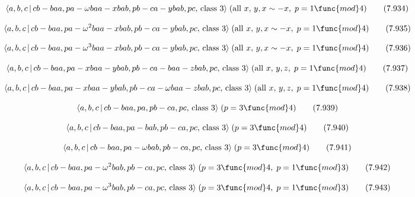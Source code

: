 \documentclass[10pt]{article}
\begin{document}
\begin{equation}
\langle a,b,c\,|\,cb-baa,pa-\omega baa-xbab,pb-ca-ybab,pc,\,\text{class }%
3\rangle \;(\text{all }x,\,y,x\sim -x,\;p=1\func{mod}4)  \tag{7.934}
\end{equation}

\begin{equation}
\langle a,b,c\,|\,cb-baa,pa-\omega ^{2}baa-xbab,pb-ca-ybab,pc,\,\text{class }%
3\rangle \;(\text{all }x,\,y,x\sim -x,\;p=1\func{mod}4)  \tag{7.935}
\end{equation}

\begin{equation}
\langle a,b,c\,|\,cb-baa,pa-\omega ^{3}baa-xbab,pb-ca-ybab,pc,\,\text{class }%
3\rangle \;(\text{all }x,\,y,x\sim -x,\;p=1\func{mod}4)  \tag{7.936}
\end{equation}

\begin{equation}
\langle a,b,c\,|\,cb-baa,pa-xbaa-ybab,pb-ca-baa-zbab,pc,\,\text{class }%
3\rangle \;(\text{all }x,\,y,z,\;p=1\func{mod}4)  \tag{7.937}
\end{equation}

\begin{equation}
\langle a,b,c\,|\,cb-baa,pa-xbaa-ybab,pb-ca-\omega baa-zbab,pc,\,\text{class 
}3\rangle \;(\text{all }x,\,y,z,\;p=1\func{mod}4)  \tag{7.938}
\end{equation}

\begin{equation}
\langle a,b,c\,|\,cb-baa,pa,pb-ca,pc,\,\text{class }3\rangle \;(p=3 \func{mod%
} 4)  \tag{7.939}
\end{equation}

\begin{equation}
\langle a,b,c\,|\,cb-baa,pa-bab,pb-ca,pc,\,\text{class }3\rangle \;(p=3 
\func{mod} 4)  \tag{7.940}
\end{equation}

\begin{equation}
\langle a,b,c\,|\,cb-baa,pa-\omega bab,pb-ca,pc,\,\text{class }3\rangle
\;(p=3\func{mod}4)  \tag{7.941}
\end{equation}

\begin{equation}
\langle a,b,c\,|\,cb-baa,pa-\omega ^{2}bab,pb-ca,pc,\,\text{class }3\rangle
\;(p=3\func{mod}4,\;p=1\func{mod}3)  \tag{7.942}
\end{equation}

\begin{equation}
\langle a,b,c\,|\,cb-baa,pa-\omega ^{3}bab,pb-ca,pc,\,\text{class }3\rangle
\;(p=3\func{mod}4,\;p=1\func{mod}3)  \tag{7.943}
\end{equation}
\end{document}
